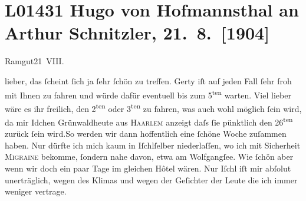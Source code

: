 

\section[Hugo von Hofmannsthal an Arthur Schnitzler, 21. 8. {[}1904{]}]{L01431 Hugo von Hofmannsthal an Arthur Schnitzler, 21. 8. {[}1904{]}}
\nopagebreak{}
\rehead{ }\normalsize\beginnumbering{}
\toendnotes[C]{\smallbreak\pagebreak[2]}
\toendnotes[C]{\smallbreak}
\pstart
           \raggedleft{}{\pb}Ramgut21 VIII.\pend
           
\pstart{}lieber, \pend\vspace{0.5em}
\pstart
           das ſcheint ſich ja ſehr ſchön zu treffen. Gerty iſt auf jeden Fall ſehr froh mit Ihnen zu fahren und würde dafür
               eventuell bis zum 5\textsuperscript{ten} warten. Viel lieber wäre es ihr freilich, den 2\textsuperscript{ten} oder 3\textsuperscript{ten} zu fahren, was auch wohl möglich ſein wird, da mir Idchen Grünwaldheute aus \textsc{Haarlem} anzeigt daſs ſie pünktlich den 26\textsuperscript{ten} zurück ſein wird.\hspace*{1.5em}So werden wir dann
               hoffentlich eine ſchöne Woche zuſammen haben. Nur dürfte ich mich kaum in Iſchlſelber niederlaſſen, wo ich mit Sicherheit \textsc{Migraine} bekomme, ſondern nahe davon, etwa am Wolfgangſee. Wie ſchön {\pb}aber wenn wir doch ein paar Tage
               im gleichen Hôtel wären. Nur Iſchl iſt mir
               abſolut unerträglich, wegen des Klimas und wegen der Geſichter der Leute die ich
               immer weniger vertrage.\pend
           
